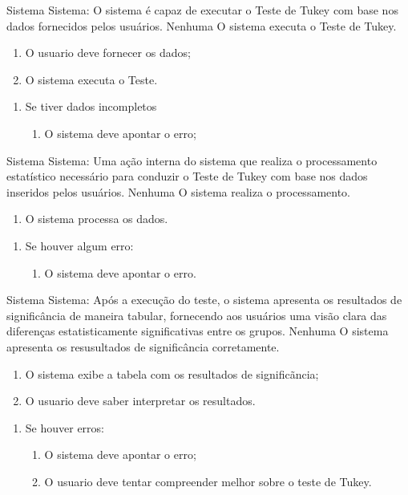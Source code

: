 {Sistema}
{Sistema: O sistema é capaz de executar o Teste de Tukey com base nos dados fornecidos pelos usuários.}
{Nenhuma}
{O sistema executa o Teste de Tukey.}
{
	\begin{enumerate}[label=FB\arabic*.]
		\item O usuario deve fornecer os dados;
		\item O sistema executa o Teste.
		
	\end{enumerate}
}{
	\begin{enumerate}[label=FA\arabic*.]
		\item Se tiver dados incompletos
			\begin{enumerate}
				\item O sistema deve apontar o erro;
			\end{enumerate}
	\end{enumerate}
}{}{}

{Sistema}
{Sistema: Uma ação interna do sistema que realiza o processamento estatístico necessário para conduzir o Teste de Tukey com base nos dados inseridos pelos usuários.}
{Nenhuma}
{O sistema realiza o processamento.}
{
	\begin{enumerate}[label=FB\arabic*.]
		\item O sistema processa os dados.
	
	\end{enumerate}
}{
	\begin{enumerate}[label=FA\arabic*.]
		\item Se houver algum erro:
			\begin{enumerate}
				\item O sistema deve apontar o erro.
			\end{enumerate}
	\end{enumerate}
}{}{}

{Sistema}
{Sistema: Após a execução do teste, o sistema apresenta os resultados de significância de maneira tabular, fornecendo aos usuários uma visão clara das diferenças estatisticamente significativas entre os grupos.
}
{Nenhuma}
{O sistema apresenta os resusultados de significância corretamente.}
{
	\begin{enumerate}[label=FB\arabic*.]
		\item O sistema exibe a tabela com os resultados de significãncia;
		\item O usuario deve saber interpretar os resultados.
	\end{enumerate}
}{
	\begin{enumerate}[label=FA\arabic*.]
		\item Se houver erros:
			\begin{enumerate}
				\item O sistema deve apontar o erro;
				\item O usuario deve tentar compreender melhor sobre o teste de Tukey.
			\end{enumerate}
	\end{enumerate}
}{}{}



